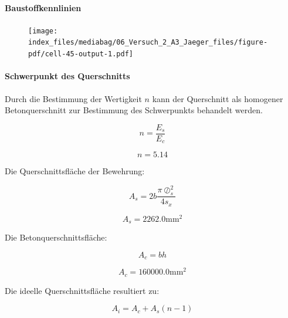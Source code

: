 \documentclass[
  12pt,
  letterpaper,
  egregdoesnotlikesansseriftitles]{scrreprt}
\let\oldparagraph\paragraph
\renewcommand{\paragraph}[1]{\oldparagraph{#1}\mbox{}}
\begin{document}
\hypertarget{baustoffkennlinien}{%
\paragraph{Baustoffkennlinien}\label{baustoffkennlinien}}

\begin{figure}[H]

{\centering \texttt{[image: index\_files/mediabag/06\_Versuch\_2\_A3\_Jaeger\_files/figure-pdf/cell-45-output-1.pdf]}

}

\end{figure}

\hypertarget{schwerpunkt-des-querschnitts}{%
\paragraph{Schwerpunkt des
Querschnitts}\label{schwerpunkt-des-querschnitts}}

Durch die Bestimmung der Wertigkeit \(n\) kann der Querschnitt als
homogener Betonquerschnitt zur Bestimmung des Schwerpunkts behandelt
werden.

\begin{equation}n = \frac{E_{s}}{E_{c}}\end{equation}

\begin{equation}n = 5.14\end{equation}

Die Querschnittsfläche der Bewehrung:

\begin{equation}A_{s} = 2 b \frac{\pi \oslash_{s}^{2}}{4 s_{x}}\end{equation}

\begin{equation}A_{s} = 2262.0 \text{mm}^{2}\end{equation}

Die Betonquerschnittsfläche:

\begin{equation}A_{c} = b h\end{equation}

\begin{equation}A_{c} = 160000.0 \text{mm}^{2}\end{equation}

Die ideelle Querschnittsfläche resultiert zu:

\begin{equation}A_{i} = A_{c} + A_{s} \left(n - 1\right)\end{equation}
\end{document}
